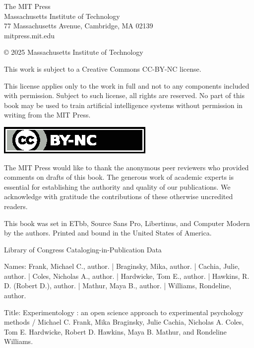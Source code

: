 \begin{titlepage}
  \vspace*{\fill}
  {\rmfamily\scriptsize
    The MIT Press\\
    Massachusetts Institute of Technology\\
    77 Massachusetts Avenue, Cambridge, MA 02139\\
    mitpress.mit.edu\par
    \vspace{2ex}
    © 2025 Massachusetts Institute of Technology\par
    This work is subject to a Creative Commons CC-BY-NC license.\par
    This license applies only to the work in full and not to any components included with permission. Subject to such license, all rights are reserved. No part of this book may be used to train artificial intelligence systems without permission in writing from the MIT Press.\par
    \includegraphics{resources/tex/by-nc[48]}\par
    The MIT Press would like to thank the anonymous peer reviewers who provided comments on drafts of this book. The generous work of academic experts is essential for establishing the authority and quality of our publications. We acknowledge with gratitude the contributions of these otherwise uncredited readers.\par
    This book was set in ETbb, Source Sans Pro, Libertinus, and Computer Modern by the authors. Printed and bound in the United States of America.

  \begin{tcolorbox}[size=minimal, boxrule=0pt, width=0.6\linewidth]
    {\scriptsize
    \raggedright
    \leftskip 0.15in
    \parindent -0.15in
    Library of Congress Cataloging-in-Publication Data
    
    Names: Frank, Michael C., author. | Braginsky, Mika, author. | Cachia,
       Julie, author. | Coles, Nicholas A., author. | Hardwicke, Tom E., author. | Hawkins, R. D. (Robert
       D.), author. | Mathur, Maya B., author. | Williams, Rondeline, author. 
    \parskip 0in

    Title: Experimentology : an open science approach to experimental
       psychology methods / Michael C. Frank, Mika Braginsky, Julie Cachia,
       Nicholas A. Coles, Tom E. Hardwicke, Robert D. Hawkins, Maya B. Mathur, and
       Rondeline Williams. 
    
}
\end{tcolorbox}}
\end{titlepage}
